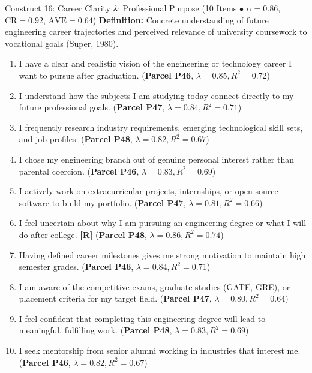 \documentclass[10pt,a4paper]{article}
\begin{document}
\vspace{0.2cm}
\begin{constructbox}{Construct 16: Career Clarity \& Professional Purpose (10 Items $\bullet$ $\alpha = 0.86$, $\text{CR} = 0.92$, $\text{AVE} = 0.64$)}
\textbf{Definition:} Concrete understanding of future engineering career trajectories and perceived relevance of university coursework to vocational goals (Super, 1980).
\begin{enumerate}[label=\textbf{Q\arabic*.}, leftmargin=2.5em, itemsep=2pt, resume]
  \item I have a clear and realistic vision of the engineering or technology career I want to pursue after graduation. \hfill (\textbf{Parcel P46}, $\lambda = 0.85, R^2 = 0.72$)
  \item I understand how the subjects I am studying today connect directly to my future professional goals. \hfill (\textbf{Parcel P47}, $\lambda = 0.84, R^2 = 0.71$)
  \item I frequently research industry requirements, emerging technological skill sets, and job profiles. \hfill (\textbf{Parcel P48}, $\lambda = 0.82, R^2 = 0.67$)
  \item I chose my engineering branch out of genuine personal interest rather than parental coercion. \hfill (\textbf{Parcel P46}, $\lambda = 0.83, R^2 = 0.69$)
  \item I actively work on extracurricular projects, internships, or open-source software to build my portfolio. \hfill (\textbf{Parcel P47}, $\lambda = 0.81, R^2 = 0.66$)
  \item I feel uncertain about why I am pursuing an engineering degree or what I will do after college. \textbf{[R]} \hfill (\textbf{Parcel P48}, $\lambda = 0.86, R^2 = 0.74$)
  \item Having defined career milestones gives me strong motivation to maintain high semester grades. \hfill (\textbf{Parcel P46}, $\lambda = 0.84, R^2 = 0.71$)
  \item I am aware of the competitive exams, graduate studies (GATE, GRE), or placement criteria for my target field. \hfill (\textbf{Parcel P47}, $\lambda = 0.80, R^2 = 0.64$)
  \item I feel confident that completing this engineering degree will lead to meaningful, fulfilling work. \hfill (\textbf{Parcel P48}, $\lambda = 0.83, R^2 = 0.69$)
  \item I seek mentorship from senior alumni working in industries that interest me. \hfill (\textbf{Parcel P46}, $\lambda = 0.82, R^2 = 0.67$)
\end{enumerate}
\end{constructbox}
\end{document}
